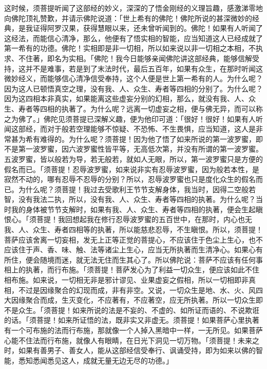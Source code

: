 \documentclass[12pt,twoside,openany]{book}
\newcommand{\kai}[1]{{\CJKfamily{kai}#1}}
\begin{document}
\kai{这时候，须菩提听闻了这部经的妙义，深深的了悟金刚经的义理旨趣，感激涕零地向佛陀顶礼赞歎，并请示佛陀说道：「世上希有的佛陀！佛陀所说的甚深微妙的经典，是我证得阿罗汉果，获得慧眼以来，还未曾听闻到的。佛陀！如果有人听闻了这经法，而能信心清净，那么，他便有了悟实相的智能，应当知道这人已经成就了第一希有的功德。佛陀！实相即是非一切相，所以如来说以非一切相之本相，不执求、不住著，即名为实相。「佛陀！我今日能够亲闻佛陀讲这部经典，能够信解受持，这并不是难事，若是到了末法时代，最后五百年，如果有众生，在那时听闻这微妙经义，而能够信心清净信受奉持，这个人便是世上第一希有的人。为什么呢？因为这人已顿悟真空之理，没有我、人、众生、寿者等四相的分别了。为什么呢？因为这四相本非真实，如果能离这些虚妄分别的幻相，那么，就没有我、人、众生、寿者等四相的执著了。为什么呢？远离一切虚妄之相，便与佛无异，而可以称之为佛了。」佛陀见须菩提已深解义趣，便为他印可道：「很好！很好！如果有人听闻这部经，而对于般若空理能够不惊疑、不恐怖、不生畏惧，应当知道，这人是非常甚为希有难得的。为什么呢？须菩提！因为他了悟了如来所说的第一波罗蜜，即不是第一波罗蜜，因六波罗蜜性皆平等，无高低次第，并没有所谓的第一波罗蜜。五波罗蜜，皆以般若为导，若无般若，就如人无眼，所以，第一波罗蜜只是方便的假名而已。「须菩提！忍辱波罗蜜，如来说非实有忍辱波罗蜜，因为般若本性，是寂然不动的，哪有忍辱不忍辱的分别？所以，忍辱波罗蜜也只是度化众生的假名而已。为什么呢？须菩提！我过去受歌利王节节支解身体，我当时，因得二空般若智，没有我法二执，所以，没有我、人、众生、寿者等四相的执著。为什么呢？当时我的身体被节节支解时，如果有我、人、众生、寿者等四相的执著，便会生起瞋恨心。「须菩提！我回想起我在修行忍辱波罗蜜的五百世中，在那时，内心也无我、人、众生、寿者四相等的执著，所以能慈悲忍辱，不生瞋恨。所以，须菩提！菩萨应该舍离一切妄相，发无上正等正觉的菩提心，不应该住于色尘上生心，也不应该住于声、香、味、触、法等诸尘上生心，应当无所执著而生清净心。如果心有所住，便会随境而迷，就无法无住而生其心了。所以佛陀说：菩萨不应该有任何事相上的执著，而行布施。「须菩提！菩萨发心为了利益一切众生，便应该如此不住相布施。如来说，一切相无非是邪计谬见、业果虚妄之假相，所以一切相即非真相，不过是因缘聚合的幻现而成，非有非空。又说，一切众生是地、水、火、风四大因缘聚合而成，生灭变化，不应著有，不应著空，应无所执著。所以一切众生即不是众生。「须菩提！如来所说的法是不妄的、不虚的、如所证而语的、不说欺诳的话。「须菩提！如来所证悟的法，既非实又非虚无。须菩提！如果菩萨心里执著有一个可布施的法而行布施，那就像一个人掉入黑暗中一样，一无所见。如果菩萨心能不住法而行布施，就像人有眼睛，在日光下洞见一切万物。「须菩提！未来之时，如果有善男子、善女人，能从这部经信受奉行、讽诵受持，即为如来以佛的智能，悉知悉闻悉见这人，成就无量无边无尽的功德。」}
\end{document}
